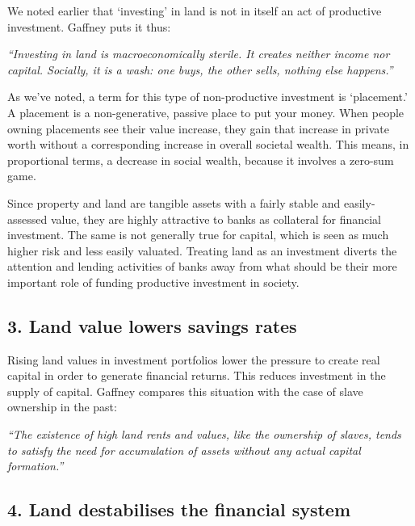 \documentclass[]{tufte-handout}
\begin{document}
We noted earlier that `investing' in land is not in itself an act of
productive investment. Gaffney puts it thus:

\emph{``Investing in land is macroeconomically sterile. It creates
neither income nor capital. Socially, it is a wash: one buys, the other
sells, nothing else happens.''}

As we've noted, a term for this type of non-productive investment is
`placement.' A placement is a non-generative, passive place to put your
money. When people owning placements see their value increase, they gain
that increase in private worth without a corresponding increase in
overall societal wealth. This means, in proportional terms, a decrease
in social wealth, because it involves a zero-sum game.

Since property and land are tangible assets with a fairly stable and
easily-assessed value, they are highly attractive to banks as collateral
for financial investment. The same is not generally true for capital,
which is seen as much higher risk and less easily valuated. Treating
land as an investment diverts the attention and lending activities of
banks away from what should be their more important role of funding
productive investment in society.

\hypertarget{land-value-lowers-savings-rates}{%
\subsection{3. Land value lowers savings
rates}\label{land-value-lowers-savings-rates}}

Rising land values in investment portfolios lower the pressure to create
real capital in order to generate financial returns. This reduces
investment in the supply of capital. Gaffney compares this situation
with the case of slave ownership in the past:

\emph{``The existence of high land rents and values, like the ownership
of slaves, tends to satisfy the need for accumulation of assets without
any actual capital formation.''}

\hypertarget{land-destabilises-the-financial-system}{%
\subsection{4. Land destabilises the financial
system}\label{land-destabilises-the-financial-system}}
\end{document}
